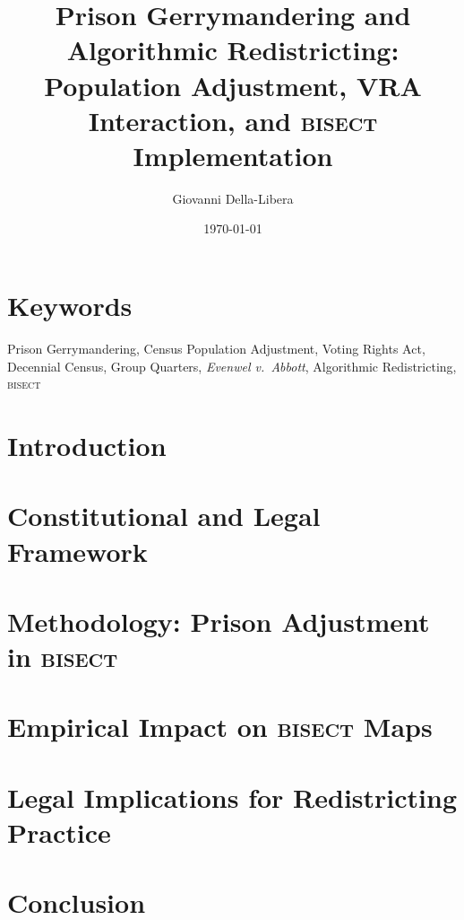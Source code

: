 \documentclass[12pt]{article}
\title{\textbf{Prison Gerrymandering and Algorithmic Redistricting:\\
Population Adjustment, VRA Interaction, and \textsc{bisect} Implementation}}
\author{Giovanni Della-Libera}
\date{\today}
\begin{document}
\maketitle

\begin{abstract}

\end{abstract}

\section*{Keywords}
Prison Gerrymandering, Census Population Adjustment, Voting Rights Act,
Decennial Census, Group Quarters, \textit{Evenwel v.\ Abbott},
Algorithmic Redistricting, \textsc{bisect}

\section{Introduction}


\section{Constitutional and Legal Framework}


\section{Methodology: Prison Adjustment in \textsc{bisect}}


\section{Empirical Impact on \textsc{bisect} Maps}


\section{Legal Implications for Redistricting Practice}


\section{Conclusion}




\end{document}
